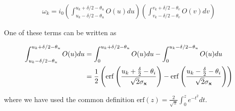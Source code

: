 \documentclass{article}
\begin{document}
\begin{align*}
\omega_{k} = i_{0}\left(\int_{u_{k}-\delta /2 - \theta_{u}}^{u_{k}+\delta /2 - \theta_{u}} O(u)du \right)\left(\int_{v_{k}-\delta /2 - \theta_{v}}^{v_{k}+\delta /2 - \theta_{v}} O(v)dv \right)
\end{align*}

One of these terms can be written as 

\begin{align*}
\int_{u_{k}-\delta /2 - \theta_{u}}^{u_{k}+\delta /2 - \theta_{u}} O(u)du &= \int_{0}^{u_{k}+\delta /2 - \theta_{u}} O(u)du - \int_{0}^{u_{k}-\delta /2 - \theta_{u}} O(u)du\\
&= \frac{1}{2}\left(\mathrm{erf}\left(\frac{u_{k}+\frac{\delta}{2}-\theta_{i}}{\sqrt{2}\sigma_{\bold{x}}}\right) -\mathrm{erf}\left(\frac{u_{k}-\frac{\delta}{2}-\theta_{i}}{\sqrt{2}\sigma_{\bold{x}}}\right)\right)
\end{align*}

where we have used the common definition $\mathrm{erf}(z) = \frac{2}{\sqrt{\pi}}\int_{0}^{z}e^{-t^{2}}dt$. 




\end{document}
